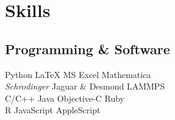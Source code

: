 \documentclass[letterpaper]{deedy-resume} %
\begin{document}
\begin{minipage}[t]{0.39\textwidth}



\section{Skills}

\subsection{Programming \& Software}

Python \textbullet{} \LaTeX \textbullet{} MS Excel \textbullet{} Mathematica\\
{\textit{Schr$\ddot{o}$dinger}} Jaguar \& Desmond \textbullet{} LAMMPS \\
C/C++ \textbullet{} Java \textbullet{} Objective-C \textbullet{} Ruby\\
R \textbullet{} JavaScript \textbullet{} AppleScript\\



\sectionspace %





\end{minipage}
\end{document}
